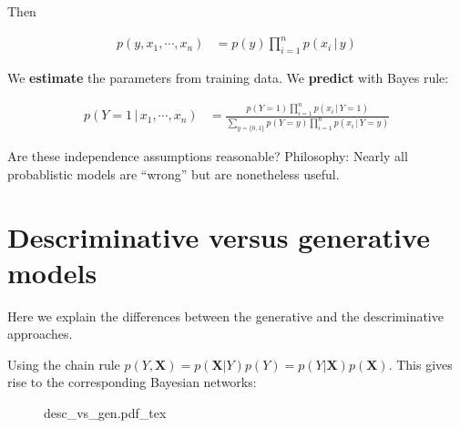 \documentclass{article}
\begin{document}
Then

\begin{align}
    p(y, x_{1}, \cdots , x_{n}) &= p(y) \prod_{i=1}^{n}p(x_{i}\,| \,y)
\end{align}

We \textbf{estimate} the parameters from training data.
We \textbf{predict} with Bayes rule:

\begin{align}
    p(Y = 1 \, | \, x_{1}, \cdots , x_{n}) &= 
     \frac{p(Y=1)\prod_{i=1}^{n}p(x_{i} \, | \, Y = 1)}{\sum_{y=\{0,1\}}p(Y=y)\prod_{i=1}^{n}p(x_{i} \, | \, Y = y)}
\end{align}

Are these independence assumptions reasonable?
Philosophy: Nearly all probablistic models are ``wrong'' but are nonetheless useful.

\section{Descriminative versus generative models}

Here we explain the differences between the generative and the descriminative approaches.

Using the chain rule $p(Y, \boldsymbol{X}) = p(\boldsymbol{X} | Y)p(Y) = p(Y | \boldsymbol{X})p(\boldsymbol{X}) $.
This gives rise to the corresponding Bayesian networks:

\begin{figure}[hbt!]
    \centering
    \begin{normalsize}
        {desc_vs_gen.pdf_tex}
    \end{normalsize}
    \label{fig:Descriminative versus generative}
\end{figure}
\end{document}
